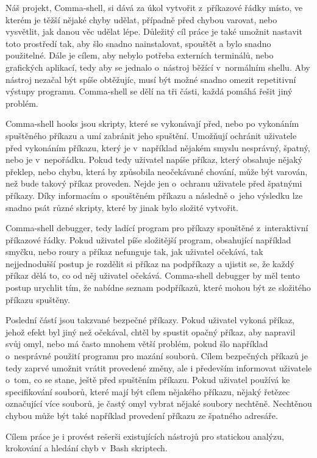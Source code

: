 \documentclass[thesis=M,czech]{FITthesis}[2012/06/26]
\begin{document}
\begin{introduction}
Náš projekt, Comma-shell, si dává za úkol vytvořit z~příkazové řádky místo, ve kterém je těžší nějaké chyby udělat, případně před chybou varovat, nebo vysvětlit, jak danou věc udělat lépe. Důležitý cíl práce je také umožnit nastavit toto prostředí tak, aby šlo snadno nainstalovat, spouštět a bylo snadno použitelné. Dále je cílem, aby nebylo potřeba externích terminálů, nebo grafických aplikací, tedy aby se jednalo o~nástroj běžící v~normálním shellu. Aby nástroj nezačal být spíše obtěžujíc, musí být možné snadno omezit repetitivní výstupy programu. Comma-shell se dělí na tři části, každá pomáhá řešit jiný problém.

Comma-shell hooks jsou skripty, které se vykonávají před, nebo po vykonáním spuštěného příkazu a umí zabránit jeho spuštění. Umožňují ochránit uživatele před vykonáním příkazu, který je v~například nějakém smyslu nesprávný, špatný, nebo je v~nepořádku. Pokud tedy  uživatel napíše příkaz, který obsahuje nějaký překlep, nebo chybu, která by způsobila neočekávané chování, může být varován, než bude takový příkaz proveden. Nejde jen o~ochranu uživatele před špatnými příkazy. Díky informacím o~spouštěném příkazu a následně o~jeho výsledku lze snadno psát různé skripty, které by jinak bylo složité vytvořit.

Comma-shell debugger, tedy ladící program pro příkazy spouštěné z~interaktivní příkazové řádky. Pokud uživatel píše složitější program, obsahující například smyčku, nebo roury a příkaz nefunguje tak, jak uživatel očekává, tak nejjednodušší postup je rozdělit si příkaz na podpříkazy a ujistit se, že každý příkaz dělá to, co od něj uživatel očekává. Comma-shell debugger by měl tento postup urychlit tím, že nabídne seznam podpříkazů, které mohou být ze složitého příkazu spuštěny.

Poslední částí jsou takzvané bezpečné příkazy. Pokud uživatel vykoná příkaz, jehož efekt byl jiný než očekával, chtěl by spustit opačný příkaz, aby napravil svůj omyl, nebo má často mnohem větší problém, pokud šlo například o~nesprávné použití programu pro mazání souborů. Cílem bezpečných příkazů je tedy zaprvé umožnit vrátit provedené změny, ale i především informovat uživatele o~tom, co se stane, ještě před spuštěním příkazu. Pokud uživatel používá ke specifikování souborů, které mají být cílem nějakého příkazu, nějaký řetězec označující více souborů, je častý omyl vybrat nějaké soubory nechtěně. Nechtěnou chybou může být také například provedení příkazu ze špatného adresáře.

Cílem práce je i provést rešerši existujících nástrojů pro statickou analýzu, krokování a hledání chyb v~Bash skriptech.




\end{introduction}
\end{document}
